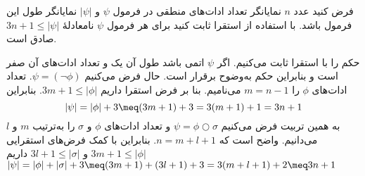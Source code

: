 فرض کنید عدد $n$ نمایانگر تعداد ادات‌های منطقی در فرمول $\psi$ و $|\psi|$ نمایانگر طول این فرمول باشد. با استفاده از استقرا ثابت کنید برای هر فرمول $\psi$ نامعادلهٔ
$3n+1\leq|\psi|$ صادق است.
\begin{ans}
حکم را با استقرا ثابت می‌کنیم. اگر $\psi$ اتمی باشد طول آن یک و تعداد ادات‌های آن صفر است و بنابراین حکم به‌وضوح برقرار است. حال فرض می‌کنیم
$\psi=(\neg\phi)$.
تعداد ادات‌های $\phi$ را $m=n-1$ می‌نامیم. بنا بر فرض استقرا داریم
$3m+1\leq|\phi|$.
بنابراین
$$
|\psi|=|\phi|+3\meq(3m+1)+3=3(m+1)+1=3n+1
$$
به همین تربیت فرض می‌کنیم
$\psi=\phi\bigcirc\sigma$
و تعداد ادات‌های $\phi$ و $\sigma$ را به‌ترتیب $m$ و $l$ می‌دانیم. واضح است که $n=m+l+1$. بنابراین با کمک فرض‌های استقرایی
$3m+1\leq|\phi|$
و
$3l+1\leq|\sigma|$
داریم
$|\psi|=|\phi|+|\sigma|+3\meq(3m+1)+(3l+1)+3=3(m+l+1)+2\meq3n+1$
\end{ans}
